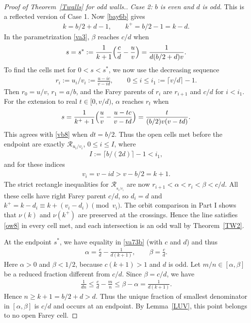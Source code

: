\documentclass[11pt,reqno,tbtags,a4paper]{amsart}
\numberwithin{equation}{section}
\renewcommand\le{\leq}
\renewcommand\ge{\geq}
\renewcommand\leq{\leqslant}
\renewcommand\geq{\geqslant}
\theoremstyle{plain}%
\theoremstyle{definition}
\theoremstyle{remark}
\newcommand\pfcase[2]{\smallskip\noindent\emph{Case #1: #2} \noindent}
\newcommand{\refT}[1]{Theorem~\ref{#1}}
\newcommand{\refL}[1]{Lemma~\ref{#1}}
\newcommand\Bigpar[1]{\Bigl(#1\Bigr)}
\newcommand\ceil[1]{\lceil#1\rceil}
\newcounter{cc}
\newcommand\ga{\alpha}
\newcommand\gb{\beta}
\newcommand\cR{{\mathcal R}}
\newcommand\uvx[1]{_{u_{#1}/v_{#1}}}
\newcommand\kx{{k^+}}
\newcommand\sx{s^*}
\newcommand\0{{\boldsymbol 0}}
\newcommand\1{{\boldsymbol 1}}
\begin{document}
\begin{proof}[Proof of \refT{Twalls} for odd walls.]
\pfcase2{$b$ is even and $d$ is odd.}
This is a reflected version of Case 1.
Now %
\eqref{bay6b} gives
\begin{align}\label{vb7}
 k=b/2+d-1,\qquad \kx=b/2-1=k-d.
\end{align}
In the parametrization \eqref{va3}, $\gb$ reaches $c/d$ when
\begin{align}\label{vb8}
 s=\sx:=\frac{1}{k+1}\Bigpar{\frac cd-\frac uv}
 =\frac{1}{d(b/2+d)v}.
\end{align}
To find the cells met for $0<s<\sx$, we now use the decreasing
sequence
\begin{align}\label{vb12}
 r_i:=u_i/v_i:=\frac{u-ic}{v-id},
 \qquad 0\le i\le i_1:=\ceil{v/d}-1.
\end{align}
Then $r_0=u/v$, $r_1=a/b$, and the Farey parents of $r_i$ are
$r_{i+1}$ and $c/d$ for $i<i_1$.
For the extension to real $t\in[0,v/d)$, $\ga$ reaches $r_t$ when
\begin{align}\label{vb13}
 s=\frac{1}{\kx+1}\Bigpar{\frac uv-\frac{u-tc}{v-td}}
 =\frac{t}{(b/2)v(v-td)}.
\end{align}
This agrees with \eqref{vb8} when $dt=b/2$.
Thus the open cells met before the endpoint are exactly
$\cR\uvx i$, $0\le i\le I$, where
\begin{align}\label{vb14a}
 I:=\ceil{b/(2d)}-1 < i_1,
\end{align}
and for these indices
\begin{align}\label{vb14b}
 v_i=v-id>v-b/2=k+1.  
\end{align}
The strict rectangle inequalities for $\cR_{\uvx i}$ are now
$r_{i+1}<\ga<r_i<\gb<c/d$.
All these cells have right Farey parent $c/d$, so $d_i=d$ and
$\kx=k-d_i\equiv k+(v_i-d_i)\pmod{v_i}$.
The orbit comparison in Part I shows that $\nu(k)$ and $\nu(\kx)$
are  preserved
at the crossings. Hence the line satisfies \eqref{ow8} in every cell met,
and each intersection is an odd wall by \refT{TW2}.

At the endpoint $\sx$, we have equality in \eqref{va73b} (with $c$ and $d$)
and thus
\begin{align}\label{vb9}
 \ga=\frac cd-\frac{1}{d(k+1)},\qquad \gb=\frac cd.
\end{align}
Here $\ga>0$ and $\gb<1/2$, because $c(k+1)>1$ and $d$ is odd.
Let $m/n\in[\ga,\gb]$ be a reduced fraction different from $c/d$.
Since $\gb=c/d$, we have
\begin{align*}
 \frac{1}{dn}
 \le \frac{c}{d}-\frac{m}{n}
 \le \gb-\ga
 =\frac{1}{d(k+1)}.
\end{align*}
Hence $n\ge k+1=b/2+d>d$.
Thus the unique fraction of smallest denominator in $[\ga,\gb]$ is $c/d$
and occurs at an endpoint. By \refL{LUV}, this point belongs to no open
Farey cell.


\end{proof}
\end{document}
